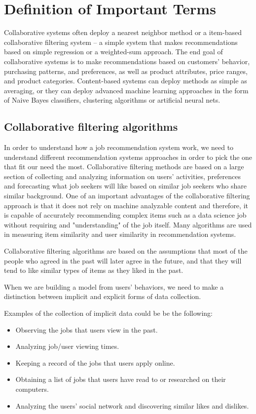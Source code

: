 \documentclass[sigconf]{acmart}
\begin{document}
\section{Definition of Important Terms}
Collaborative systems often deploy a nearest neighbor method or a item-based collaborative filtering system – a simple system that makes recommendations based on simple regression or a weighted-sum approach. The end goal of collaborative systems is to make recommendations based on customers’ behavior, purchasing patterns, and preferences, as well as product attributes, price ranges, and product categories. Content-based systems can deploy methods as simple as averaging, or they can deploy advanced machine learning approaches in the form of Naive Bayes classifiers,  clustering algorithms or artificial neural nets.

\subsection{Collaborative filtering algorithms}
In order to understand how a job recommendation system work, we need to understand different recommendation systems approaches in order to pick the one that fit our need the most. Collaborative filtering methods are based on a large section of collecting and analyzing information on users' activities, preferences and forecasting what job seekers will like based on similar job seekers who share similar background. One of an important advantages of the collaborative filtering approach is that it does not rely on machine analyzable content and therefore, it is capable of accurately recommending complex items such as a data science job without requiring and "understanding" of the job itself. Many algorithms are used in measuring item similarity and user similarity in recommendation systems. 
\par Collaborative filtering algorithms are based on the assumptions that most of the people who agreed in the past will later agree in the future, and that they will tend to like similar types of items as they liked in the past.
\par When we are building a model from users' behaviors, we need to make a distinction between implicit and explicit forms of data collection.

\par Examples of the collection of implicit data could be be the following:

\begin{itemize}
  \item Observing the jobs that users view in the past.
  \item Analyzing job/user viewing times.
  \item Keeping a record of the jobs that users apply online.
  \item Obtaining a list of jobs that users have read to or researched on their computers.
  \item Analyzing the users' social network and discovering similar likes and dislikes.
\end{itemize}
\end{document}
